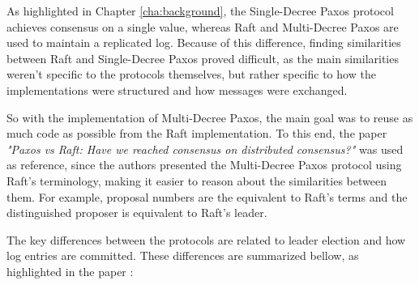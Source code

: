\vspace{0.2cm}

As highlighted in Chapter \ref{cha:background}, the Single-Decree Paxos protocol achieves consensus on a single value, whereas Raft and Multi-Decree Paxos are used to maintain a replicated log. Because of this difference, finding similarities between Raft and Single-Decree Paxos proved difficult, as the main similarities weren't specific to the protocols themselves, but rather specific to how the implementations were structured and how messages were exchanged.

So with the implementation of Multi-Decree Paxos, the main goal was to reuse as much code as possible from the Raft implementation. To this end, the paper \textit{"Paxos vs Raft: Have we reached consensus on distributed consensus?"} \cite{paxos_vs_raft} was used as reference, since the authors presented the Multi-Decree Paxos protocol using Raft's terminology, making it easier to reason about the similarities between them. For example, proposal numbers are the equivalent to Raft's terms and the distinguished proposer is equivalent to Raft's leader.

The key differences between the protocols are related to leader election and how log entries are committed. These differences are summarized bellow, as highlighted in the paper \cite{paxos_vs_raft}:

